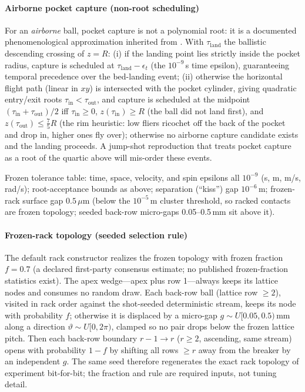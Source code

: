 \paragraph{Airborne pocket capture (non-root scheduling)} For an
\emph{airborne} ball, pocket capture is not a polynomial root: it is a
documented phenomenological approximation inherited from
\citet{kiefl2024pooltool}. With $\tau_{\mathrm{land}}$ the ballistic
descending crossing of $z = R$: (i) if the landing point lies strictly
inside the pocket radius, capture is scheduled at
$\tau_{\mathrm{land}} - \epsilon_t$ (the $10^{-9}$\,s time epsilon),
guaranteeing temporal precedence over the bed-landing event; (ii)
otherwise the horizontal flight path (linear in $xy$) is intersected
with the pocket cylinder, giving quadratic entry/exit roots
$\tau_{\mathrm{in}} < \tau_{\mathrm{out}}$, and capture is scheduled
at the midpoint $(\tau_{\mathrm{in}} + \tau_{\mathrm{out}})/2$ iff
$\tau_{\mathrm{in}} \ge 0$, $z(\tau_{\mathrm{in}}) \ge R$ (the ball
did not land first), and $z(\tau_{\mathrm{out}}) \le \tfrac{7}{5}R$
(the rim heuristic: low fliers ricochet off the back of the pocket
and drop in, higher ones fly over); otherwise no airborne capture
candidate exists and the landing proceeds. A jump-shot reproduction
that treats pocket capture as a root of the quartic above will
mis-order these events.

Frozen tolerance table: time, space, velocity, and spin epsilons all
$10^{-9}$ (s, m, m/s, rad/s); root-acceptance bounds as above;
separation (``kiss'') gap $10^{-6}$\,m; frozen-rack surface gap
$0.5\,\mu$m (below the $10^{-5}$\,m cluster threshold, so racked
contacts are frozen topology; seeded back-row micro-gaps
0.05--0.5\,mm sit above it).

\paragraph{Frozen-rack topology (seeded selection rule)} The default
rack constructor realizes the frozen topology with frozen fraction
$f = 0.7$ (a declared first-party consensus estimate; no published
frozen-fraction statistics exist). The apex wedge---apex plus row
1---always keeps its lattice nodes and consumes no random draw. Each
back-row ball (lattice row $\ge 2$), visited in rack order against the
shot-seeded deterministic stream, keeps its node with probability $f$;
otherwise it is displaced by a micro-gap $g \sim U[0.05, 0.5)$\,mm
along a direction $\vartheta \sim U[0, 2\pi)$, clamped so no pair
drops below the frozen lattice pitch. Then each back-row boundary
$r{-}1 \to r$ ($r \ge 2$, ascending, same stream) opens with
probability $1 - f$ by shifting all rows $\ge r$ away from the breaker
by an independent $g$. The same seed therefore regenerates the exact
rack topology of experiment  bit-for-bit; the fraction and
rule are required inputs, not tuning detail.

